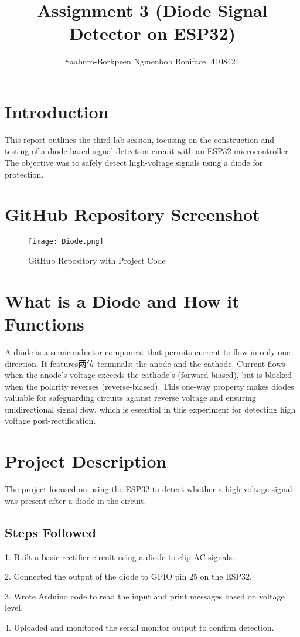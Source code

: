 \documentclass{article}
\title{Assignment 3 (Diode Signal Detector on ESP32)}
\author{Saaburo-Borkpeen Ngmenbob Boniface, 4108424}
\begin{document}
\maketitle


\section{Introduction}

This report outlines the third lab session, focusing on the construction and testing of a diode-based signal detection circuit with an ESP32 microcontroller. The objective was to safely detect high-voltage signals using a diode for protection.

\section{ GitHub Repository Screenshot}

\begin{figure}[h]
    \centering
    \texttt{[image: Diode.png]}
    \caption{ GitHub Repository with Project Code}
    \label{fig:image}
\end{figure}

\section{What is a Diode and How it Functions}
A diode is a semiconductor component that permits current to flow in only one direction. It features两位 terminals: the anode and the cathode. Current flows when the anode's voltage exceeds the cathode's (forward-biased), but is blocked when the polarity reverses (reverse-biased). This one-way property makes diodes valuable for safeguarding circuits against reverse voltage and ensuring unidirectional signal flow, which is essential in this experiment for detecting high voltage post-rectification.
\section{Project Description}
The project focused on using the ESP32 to detect whether a high voltage signal was present after a diode in the circuit.

\subsection{Steps Followed}

 \item  1. Built a basic rectifier circuit using a diode to clip AC signals.
 \item  2. Connected the output of the diode to GPIO pin 25 on the ESP32.
 \item  3. Wrote Arduino code to read the input and print messages based on voltage level.
 \item  4. Uploaded and monitored the serial monitor output to confirm detection.
\end{document}

